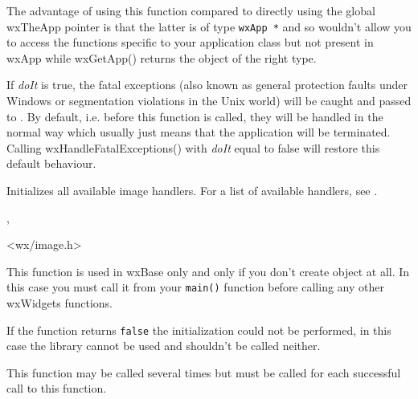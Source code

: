 The advantage of using this function compared to directly using the global
wxTheApp pointer is that the latter is of type {\tt wxApp *} and so wouldn't
allow you to access the functions specific to your application class but not
present in wxApp while wxGetApp() returns the object of the right type.


\label{wxhandlefatalexceptions}


If {\it doIt} is true, the fatal exceptions (also known as general protection
faults under Windows or segmentation violations in the Unix world) will be
caught and passed to .
By default, i.e. before this function is called, they will be handled in the
normal way which usually just means that the application will be terminated.
Calling wxHandleFatalExceptions() with {\it doIt} equal to false will restore
this default behaviour.


\label{wxinitallimagehandlers}


Initializes all available image handlers. For a list of available handlers,
see .


, 


<wx/image.h>


\label{wxinitialize}


This function is used in wxBase only and only if you don't create
 object at all. In this case you must call it from your
{\tt main()} function before calling any other wxWidgets functions.

If the function returns {\tt false} the initialization could not be performed,
in this case the library cannot be used and
 shouldn't be called neither.

This function may be called several times but
 must be called for each successful
call to this function.



